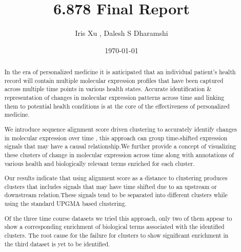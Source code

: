 \documentclass[aps,prd,final,onecolumn,a4paper,10pt]{revtex4}
\begin{document}
\title{6.878 Final Report}
\author{Iris Xu , Dalesh S Dharamshi }	
\date{\today} 

\begin{abstract}
\noindent
  In the era of personalized medicine it is anticipated that an individual patient's health record will contain multiple molecular expression profiles that have been captured across multiple time points in various health states. Accurate identification \& representation of changes in molecular expression patterns across time and linking them to potential health conditions is at the core of the effectiveness of personalized medicine. 
  
  We introduce sequence alignment score driven clustering to accurately identify changes in molecular expression over time , this approach can group time-shifted expression signals that may have a causal relationship.We further provide a concept of visualizing these clusters of change in molecular expression across time along with annotations of various health and biologically relevant terms enriched for each cluster.
  
  Our results indicate that using alignment score as a distance to clustering produces clusters that includes signals that may have time shifted due to an upstream or downstream relation.These signals tend to be separated into different clusters while using the standard UPGMA based clustering. 
  
  Of the three time course datasets we tried this approach, only two of them appear to show a corresponding enrichment of biological terms associated with the identified clusters. The root cause for the failure for clusters to show significant enrichment in the third dataset is yet to be identified.
  
\end{abstract}

\maketitle

\pagestyle{myheadings}
\thispagestyle{empty}

\end{document}
